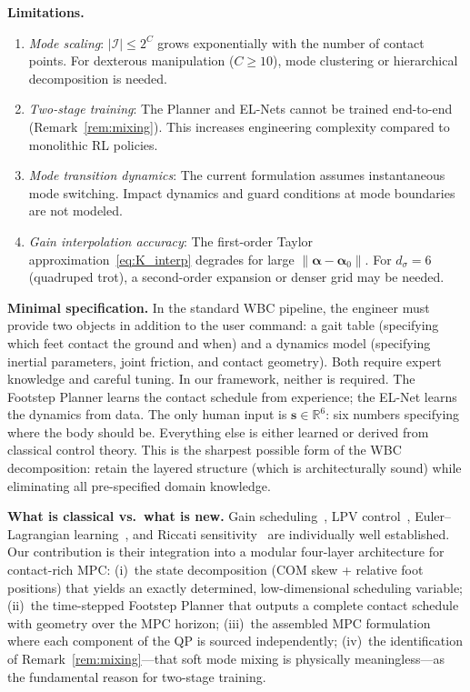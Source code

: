 \documentclass[letterpaper, 10pt, conference]{IEEEtran}
\newcommand{\R}{\mathbb{R}}
\newcommand{\balpha}{\bm{\alpha}}
\newcommand{\cI}{\mathcal{I}}
\begin{document}
\textbf{Limitations.}
\begin{enumerate}
  \item \emph{Mode scaling}: $|\cI| \leq 2^C$
    grows exponentially with the number of contact points.
    For dexterous manipulation ($C \geq 10$), mode clustering
    or hierarchical decomposition is needed.
  \item \emph{Two-stage training}: The Planner and EL-Nets
    cannot be trained end-to-end (Remark~\ref{rem:mixing}).
    This increases engineering complexity compared to
    monolithic RL policies.
  \item \emph{Mode transition dynamics}: The current formulation
    assumes instantaneous mode switching.
    Impact dynamics and guard conditions at mode boundaries
    are not modeled.
  \item \emph{Gain interpolation accuracy}: The first-order
    Taylor approximation~\eqref{eq:K_interp} degrades for
    large $\|\balpha - \balpha_0\|$.
    For $d_\sigma = 6$ (quadruped trot), a second-order
    expansion or denser grid may be needed.
\end{enumerate}

\textbf{Minimal specification.}
In the standard WBC pipeline, the engineer must provide
two objects in addition to the user command:
a gait table (specifying which feet contact the ground and when)
and a dynamics model (specifying inertial parameters, joint
friction, and contact geometry).
Both require expert knowledge and careful tuning.
In our framework, neither is required.
The Footstep Planner learns the contact schedule from
experience; the EL-Net learns the dynamics from data.
The only human input is $\bm{s} \in \R^6$: six numbers
specifying where the body should be.
Everything else is either learned or derived from
classical control theory.
This is the sharpest possible form of the WBC decomposition:
retain the layered structure (which is architecturally sound)
while eliminating all pre-specified domain knowledge.

\textbf{What is classical vs.\ what is new.}
Gain scheduling~\cite{rugh2000}, LPV control~\cite{shamma1991},
Euler--Lagrangian learning~\cite{lutter2019},
and Riccati sensitivity~\cite{hewer1971,konstantinov1993}
are individually well established.
Our contribution is their integration into a modular
four-layer architecture for contact-rich MPC:
(i)~the state decomposition (COM skew + relative foot positions)
that yields an exactly determined, low-dimensional scheduling
variable;
(ii)~the time-stepped Footstep Planner that outputs a complete
contact schedule with geometry over the MPC horizon;
(iii)~the assembled MPC formulation where each component of
the QP is sourced independently;
(iv)~the identification of Remark~\ref{rem:mixing}---that
soft mode mixing is physically meaningless---as the
fundamental reason for two-stage training.
\end{document}
